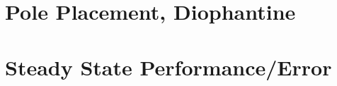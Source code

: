 \documentclass{article}
\newcommand{\sincludepdf}[2][]{
	
}
\begin{document}




%
%
%
%
%
%
%

\clearpage
\section{Pole Placement, Diophantine}

\section{Steady State Performance/Error}
\end{document}

